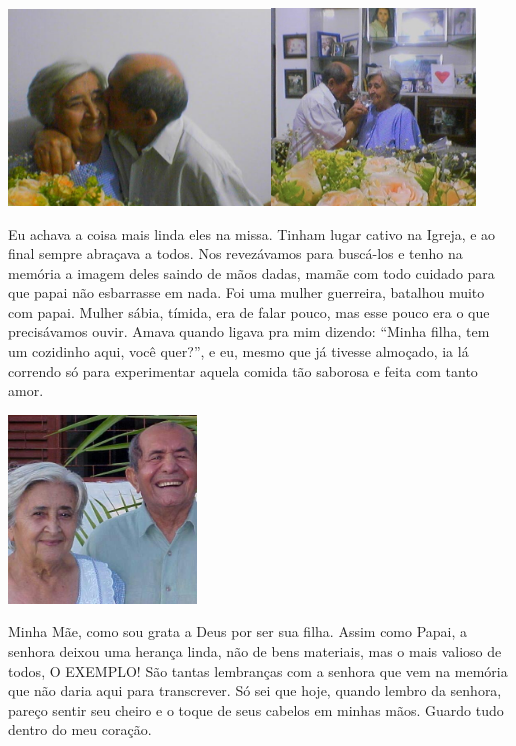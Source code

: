 \documentclass[
  brazil,
  a6paper,
  oneside,
  landscape,
  14pt]{scrbook}
\begin{document}
\includegraphics[width=2.73889in,height=2.05417in]{img/cristina/image7.jpeg}\includegraphics[width=2.13961in,height=2.06181in]{img/cristina/image8.jpeg}

Eu achava a coisa mais linda eles na missa. Tinham lugar cativo na
Igreja, e ao final sempre abraçava a todos. Nos revezávamos para
buscá-los e tenho na memória a imagem deles saindo de mãos dadas, mamãe
com todo cuidado para que papai não esbarrasse em nada. Foi uma mulher
guerreira, batalhou muito com papai. Mulher sábia, tímida, era de falar
pouco, mas esse pouco era o que precisávamos ouvir. Amava quando ligava
pra mim dizendo: ``Minha filha, tem um cozidinho aqui, você quer?'', e
eu, mesmo que já tivesse almoçado, ia lá correndo só para experimentar
aquela comida tão saborosa e feita com tanto amor.

\includegraphics[width=1.96875in,height=1.96875in]{img/cristina/image9.jpeg}

Minha Mãe, como sou grata a Deus por ser sua filha. Assim como Papai, a
senhora deixou uma herança linda, não de bens materiais, mas o mais
valioso de todos, O EXEMPLO! São tantas lembranças com a senhora que vem
na memória que não daria aqui para transcrever. Só sei que hoje, quando
lembro da senhora, pareço sentir seu cheiro e o toque de seus cabelos em
minhas mãos. Guardo tudo dentro do meu coração.
\end{document}
